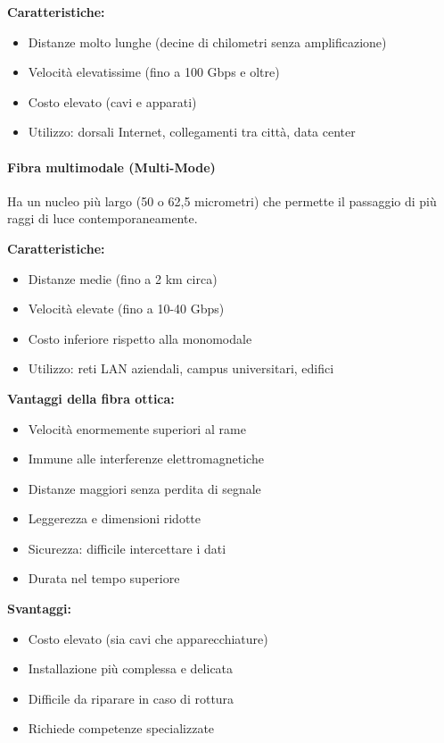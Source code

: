 \documentclass[12pt,a4paper]{article}
\begin{document}
\textbf{Caratteristiche:}
\begin{itemize}
    \item Distanze molto lunghe (decine di chilometri senza amplificazione)
    \item Velocità elevatissime (fino a 100 Gbps e oltre)
    \item Costo elevato (cavi e apparati)
    \item Utilizzo: dorsali Internet, collegamenti tra città, data center
\end{itemize}

\paragraph{Fibra multimodale (Multi-Mode)}
Ha un nucleo più largo (50 o 62,5 micrometri) che permette il passaggio di più raggi di luce contemporaneamente.

\textbf{Caratteristiche:}
\begin{itemize}
    \item Distanze medie (fino a 2 km circa)
    \item Velocità elevate (fino a 10-40 Gbps)
    \item Costo inferiore rispetto alla monomodale
    \item Utilizzo: reti LAN aziendali, campus universitari, edifici
\end{itemize}

\textbf{Vantaggi della fibra ottica:}
\begin{itemize}
    \item Velocità enormemente superiori al rame
    \item Immune alle interferenze elettromagnetiche
    \item Distanze maggiori senza perdita di segnale
    \item Leggerezza e dimensioni ridotte
    \item Sicurezza: difficile intercettare i dati
    \item Durata nel tempo superiore
\end{itemize}

\textbf{Svantaggi:}
\begin{itemize}
    \item Costo elevato (sia cavi che apparecchiature)
    \item Installazione più complessa e delicata
    \item Difficile da riparare in caso di rottura
    \item Richiede competenze specializzate
\end{itemize}
\end{document}
